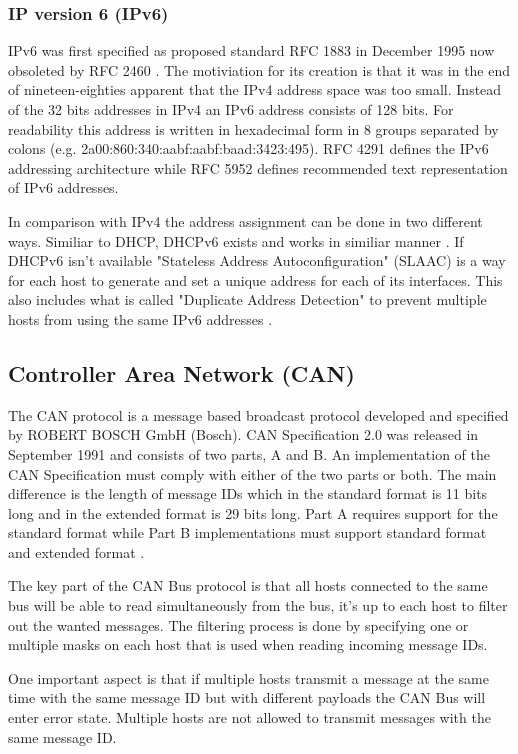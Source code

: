 \subsubsection{IP version 6 (IPv6)}
IPv6 was first specified as proposed standard RFC 1883 \cite{web:rfc1883} in
December 1995 now obsoleted by RFC 2460 \cite{web:rfc2460}. The motiviation for
its creation is that it was in the end of nineteen-eighties apparent that the
IPv4 address space was too small. Instead of the 32 bits addresses in IPv4 an
IPv6 address consists of 128 bits. For readability this address is
written in hexadecimal form in 8 groups separated by colons
(e.g. 2a00:860:340:aabf:aabf:baad:3423:495). RFC 4291 defines the IPv6
addressing architecture \cite{web:rfc4291} while RFC 5952 \cite{web:rfc5952}
defines recommended text representation of IPv6 addresses.

In comparison with IPv4 the address assignment can be done in two different
ways. Similiar to DHCP, DHCPv6 exists and works in similiar manner
\cite{web:rfc3315}. If DHCPv6 isn't available "Stateless Address
Autoconfiguration" (SLAAC) is a way for each host to generate and set a unique
address for each of its interfaces.
This also includes what is called "Duplicate Address Detection" to prevent
multiple hosts from using the same IPv6 addresses \cite{web:rfc4862, web:rfc4941}.

\subsection{Controller Area Network (CAN)}
The CAN protocol is a message based broadcast protocol developed and specified
by ROBERT BOSCH GmbH (Bosch). CAN Specification 2.0 was released in September
1991 and consists of two parts, A and B. An implementation of the CAN
Specification must comply with either of the two parts or both. The main
difference is the length of message IDs which in the standard format is 11 bits
long and in the extended format is 29 bits long. Part A requires support for
the standard format while Part B implementations must support
standard format and extended format \cite{standard:can_bus}.

The key part of the CAN Bus protocol is that all hosts connected to the same
bus will be able to read simultaneously from the bus, it's up to each host to
filter out the wanted messages. The filtering process is done by specifying one
or multiple masks on each host that is used when reading incoming message
IDs.

One important aspect is that if multiple hosts transmit a message at the same
time with the same message ID but with different payloads the CAN Bus will
enter error state. Multiple hosts are not allowed to transmit messages with the
same message ID.

